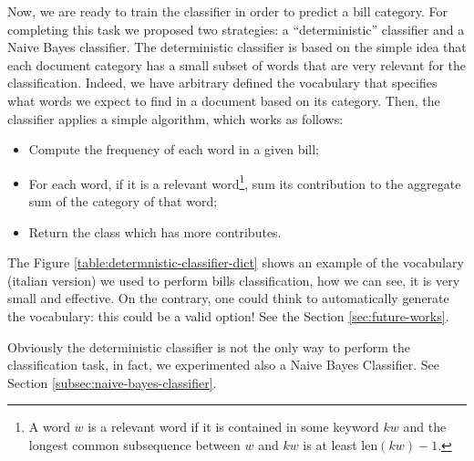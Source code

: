 \documentclass[10pt,twocolumn,letterpaper]{article}
\begin{document}
Now, we are ready to train the classifier in order to predict a bill
category. For completing this task we proposed two strategies: a
``deterministic'' classifier and a Naive Bayes classifier. The
deterministic classifier is based on the simple idea that each
document category has a small subset of words that are very relevant
for the classification. Indeed, we have arbitrary defined the
vocabulary that specifies what words we expect to find in a document
based on its category. Then, the classifier applies a simple
algorithm, which works as follows:

\begin{itemize}
  \item Compute the frequency of each word in a given bill;
  \item For each word, if it is a relevant word\footnote{A word $w$ is
    a relevant word if it is contained in some keyword $kw$ and the
    longest common subsequence between $w$ and $kw$ is at least
    $\mathrm{len}(kw) - 1$.}, sum its contribution to the aggregate
    sum of the category of that word;
  \item Return the class which has more contributes.
\end{itemize}

The Figure \ref{table:determnistic-classifier-dict} shows an example
of the vocabulary (italian version) we used to perform bills
classification, how we can see, it is very small and effective.  On
the contrary, one could think to automatically generate the
vocabulary: this could be a valid option! See the Section
\ref{sec:future-works}.

Obviously the deterministic classifier is not the only way to perform
the classification task, in fact, we experimented also a Naive Bayes
Classifier. See Section \ref{subsec:naive-bayes-classifier}.
\end{document}

